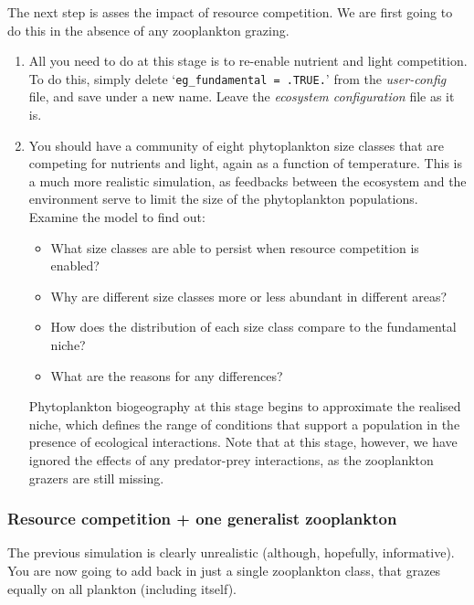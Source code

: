 \documentclass[11pt,fleqn]{book} %
\begin{document}
The next step is asses the impact of resource competition. We are first going to do this in the absence of any zooplankton grazing. 

\vspace{2mm}
\begin{enumerate}[noitemsep]

\item All you need to do at this stage is to re-enable nutrient and light competition. To do this, simply delete `\texttt{eg\_fundamental~=~.TRUE.}' from the \textit{user-config} file, and save under a new name. Leave the \textit{ecosystem configuration} file as it is.

\item You should have a community of eight phytoplankton size classes that are competing for nutrients and light, again as a function of temperature. This is a much more realistic simulation, as feedbacks between the ecosystem and the environment serve to limit the size of the phytoplankton populations. \\Examine the model to find out:
\begin{itemize}
\item What size classes are able to persist when resource competition is enabled?
\item Why are different size classes more or less abundant in different areas?
\item How does the distribution of each size class compare to the fundamental niche?
\item What are the reasons for any differences?
\end{itemize}
Phytoplankton biogeography at this stage begins to approximate the realised niche, which defines the range of conditions that support a population in the presence of ecological interactions. Note that at this stage, however, we have ignored the effects of any predator-prey interactions, as the zooplankton grazers are still missing.

\end{enumerate}
\vspace{2mm}


\subsubsection*{Resource competition + one generalist zooplankton} 

The previous simulation is clearly unrealistic (although, hopefully, informative). You are now going to add back in just a single zooplankton class, that grazes equally on all plankton (including itself). 
\end{document}
